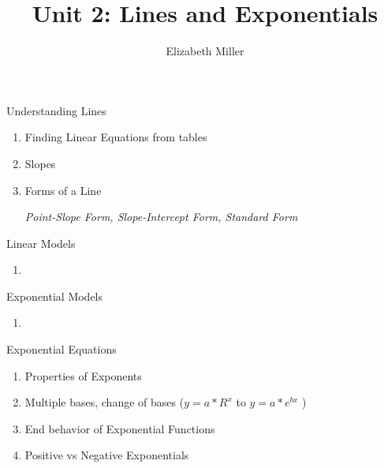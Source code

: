 \documentclass{ximera}
\author{Elizabeth Miller}
\title{Unit 2: Lines and Exponentials}
\begin{document}
\begin{abstract}
\end{abstract}
\maketitle

\begin{overview}
\item Understanding Lines %
	\begin{enumerate}
	\item Finding Linear Equations from tables
	\item Slopes
	\item Forms of a Line

		\textit{Point-Slope Form, Slope-Intercept Form, Standard Form} 

	\end{enumerate}
	
\item Linear Models %
	\begin{enumerate}
	\item 
	\end{enumerate}

\item Exponential Models %
	\begin{enumerate}
	\item 
	\end{enumerate}

\item Exponential Equations %
	\begin{enumerate}
	\item Properties of Exponents 
	\item Multiple bases, change of bases ($y = a*R^{x}$ to $y = a*e^{bx}$ )

	\item End behavior of Exponential Functions 
	\item Positive vs Negative Exponentials 
	\end{enumerate} 

\end{overview}
\end{document}
